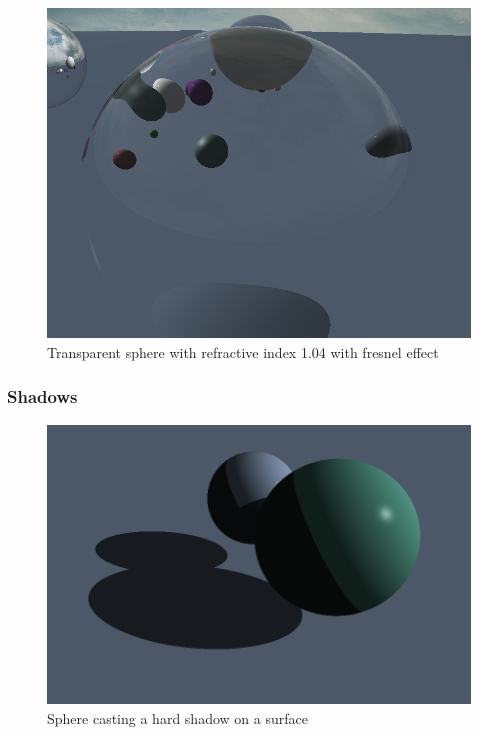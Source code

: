 \documentclass[final]{cmpreport}
\begin{document}
\begin{figure}
    \centering
    \includegraphics[width=\textwidth]{img/fresnel_hollow.png}
    \caption{Transparent sphere with refractive index 1.04 with fresnel effect}
    \label{fresnel_hollow}
\end{figure}

\subsubsection{Shadows}

\begin{figure}
    \centering
    \includegraphics[width=\textwidth]{img/hard_shadow.png}
    \caption{Sphere casting a hard shadow on a surface}
    \label{hard_shadow}
\end{figure}
\end{document}
